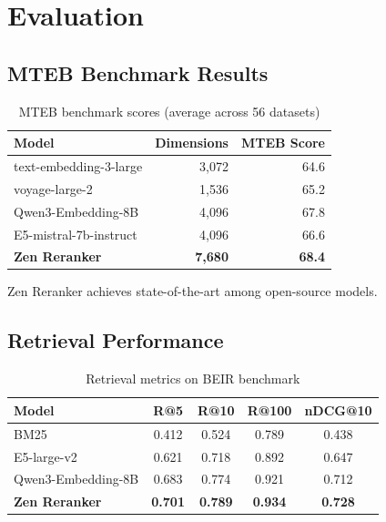 \section{Evaluation}

\label{sec:evaluation}

\subsection{MTEB Benchmark Results}

\begin{table}[h]
\centering
\caption{MTEB benchmark scores (average across 56 datasets)}
\label{tab:mteb}
\begin{tabular}{lrr}
\toprule
\textbf{Model} & \textbf{Dimensions} & \textbf{MTEB Score} \\
\midrule
text-embedding-3-large & 3,072 & 64.6 \\
voyage-large-2 & 1,536 & 65.2 \\
Qwen3-Embedding-8B & 4,096 & 67.8 \\
E5-mistral-7b-instruct & 4,096 & 66.6 \\
\textbf{Zen Reranker} & \textbf{7,680} & \textbf{68.4} \\
\bottomrule
\end{tabular}
\end{table}

Zen Reranker achieves state-of-the-art among open-source models.

\subsection{Retrieval Performance}

\begin{table}[h]
\centering
\caption{Retrieval metrics on BEIR benchmark}
\label{tab:retrieval}
\begin{tabular}{lcccc}
\toprule
\textbf{Model} & \textbf{R@5} & \textbf{R@10} & \textbf{R@100} & \textbf{nDCG@10} \\
\midrule
BM25 & 0.412 & 0.524 & 0.789 & 0.438 \\
E5-large-v2 & 0.621 & 0.718 & 0.892 & 0.647 \\
Qwen3-Embedding-8B & 0.683 & 0.774 & 0.921 & 0.712 \\
\textbf{Zen Reranker} & \textbf{0.701} & \textbf{0.789} & \textbf{0.934} & \textbf{0.728} \\
\bottomrule
\end{tabular}
\end{table}

